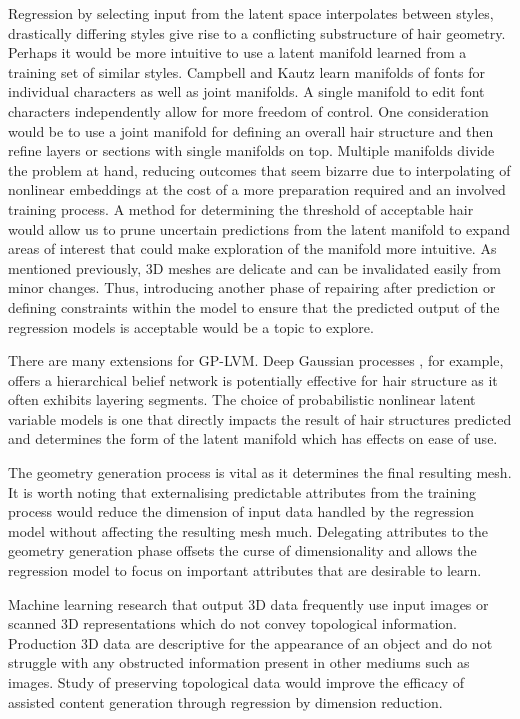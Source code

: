 \documentclass[ %
author={Dillon Keith Diep},
supervisor={Dr. Carl Henrik Ek},
degree={MEng},
title={ART-CG Hair:},
subtitle={Assisted Real-time Content Generation of Stylised Virtual Hair},
type={Research},
year={2017} ]{dissertation}
\begin{document}
Regression by selecting input from the latent space interpolates between styles, drastically differing styles give rise to a conflicting substructure of hair geometry. Perhaps it would be more intuitive to use a latent manifold learned from a training set of similar styles.
Campbell and Kautz \cite{fontmanifold} learn manifolds of fonts for individual characters as well as joint manifolds. A single manifold to edit font characters independently allow for more freedom of control. One consideration would be to use a joint manifold for defining an overall hair structure and then refine layers or sections with single manifolds on top. Multiple manifolds divide the problem at hand, reducing outcomes that seem bizarre due to interpolating of nonlinear embeddings at the cost of a more preparation required and an involved training process.
A method for determining the threshold of acceptable hair would allow us to prune uncertain predictions from the latent manifold to expand areas of interest that could make exploration of the manifold more intuitive. 
As mentioned previously, 3D meshes are delicate and can be invalidated easily from minor changes. Thus, introducing another phase of repairing after prediction or defining constraints within the model to ensure that the predicted output of the regression models is acceptable would be a topic to explore.

There are many extensions for GP-LVM. Deep Gaussian processes \cite{deepgp}, for example, offers a hierarchical belief network is potentially effective for hair structure as it often exhibits layering segments.
The choice of probabilistic nonlinear latent variable models is one that directly impacts the result of hair structures predicted and determines the form of the latent manifold which has effects on ease of use.

The geometry generation process is vital as it determines the final resulting mesh. It is worth noting that externalising predictable attributes from the training process would reduce the dimension of input data handled by the regression model without affecting the resulting mesh much. Delegating attributes to the geometry generation phase offsets the curse of dimensionality and allows the regression model to focus on important attributes that are desirable to learn.

Machine learning research that output 3D data frequently use input images or scanned 3D representations which do not convey topological information. Production 3D data are descriptive for the appearance of an object and do not struggle with any obstructed information present in other mediums such as images. Study of preserving topological data would improve the efficacy of assisted content generation through regression by dimension reduction.
\end{document}
